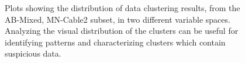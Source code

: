 \documentclass[final,authoryear,5p,times,twocolumn]{elsarticle}
\begin{document}
\begin{figure} [!ht]
    \begin{center}
    \end{center}
\caption{Plots showing the distribution of data clustering results, from the AB-Mixed, MN-Cable2 subset, in two different variable spaces. Analyzing the visual distribution of the clusters can be useful for identifying patterns and characterizing clusters which contain suspicious data.}
\label{fig:AB_Mixed_MN_Cable2_ClusterComp}
\end{figure}
\end{document}
